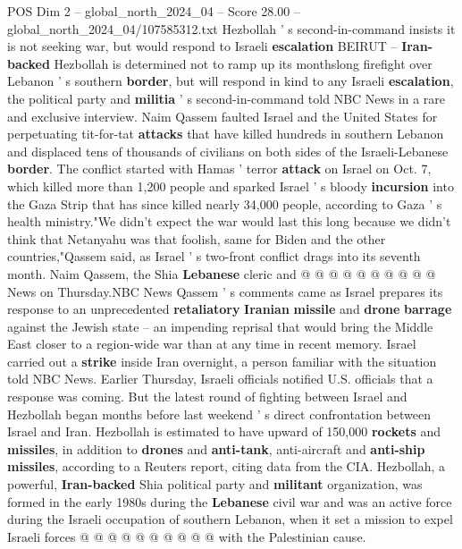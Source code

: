 \begin{textsample}{POS Dim 2 – global\_north\_2024\_04 – Score 28.00 – global\_north\_2024\_04/107585312.txt}  \label{ex:f2_pos_169}
Hezbollah ' s second-in-command insists it is not seeking war, but would respond to Israeli \textbf{escalation} BEIRUT -- \textbf{Iran-backed} Hezbollah is determined not to ramp up its monthslong firefight over Lebanon ' s southern \textbf{border}, but will respond in kind to any Israeli \textbf{escalation}, the political party and \textbf{militia} ' s second-in-command told NBC News in a rare and exclusive interview.
Naim Qassem faulted Israel and the United States for perpetuating tit-for-tat \textbf{attacks} that have killed hundreds in southern Lebanon and displaced tens of thousands of civilians on both sides of the Israeli-Lebanese \textbf{border}.
The conflict started with Hamas ' terror \textbf{attack} on Israel on Oct. 7, which killed more than 1,200 people and sparked Israel ' s bloody \textbf{incursion} into the Gaza Strip that has since killed nearly 34,000 people, according to Gaza ' s health ministry."We didn't expect the war would last this long because we didn't think that Netanyahu was that foolish, same for Biden and the other countries,"Qassem said, as Israel ' s two-front conflict drags into its seventh month.
Naim Qassem, the Shia \textbf{Lebanese} cleric and @ @ @ @ @ @ @ @ @ @ News on Thursday.NBC News Qassem ' s comments came as Israel prepares its response to an unprecedented \textbf{retaliatory} \textbf{Iranian} \textbf{missile} and \textbf{drone} \textbf{barrage} against the Jewish state -- an impending reprisal that would bring the Middle East closer to a region-wide war than at any time in recent memory.
Israel carried out a \textbf{strike} inside Iran overnight, a person familiar with the situation told NBC News.
Earlier Thursday, Israeli officials notified U.S. officials that a response was coming.
But the latest round of fighting between Israel and Hezbollah began months before last weekend ' s direct confrontation between Israel and Iran.
Hezbollah is estimated to have upward of 150,000 \textbf{rockets} and \textbf{missiles}, in addition to \textbf{drones} and \textbf{anti-tank}, anti-aircraft and \textbf{anti-ship} \textbf{missiles}, according to a Reuters report, citing data from the CIA.
Hezbollah, a powerful, \textbf{Iran-backed} Shia political party and \textbf{militant} organization, was formed in the early 1980s during the \textbf{Lebanese} civil war and was an active force during the Israeli occupation of southern Lebanon, when it set a mission to expel Israeli forces @ @ @ @ @ @ @ @ @ @ with the Palestinian cause.

\end{textsample}

